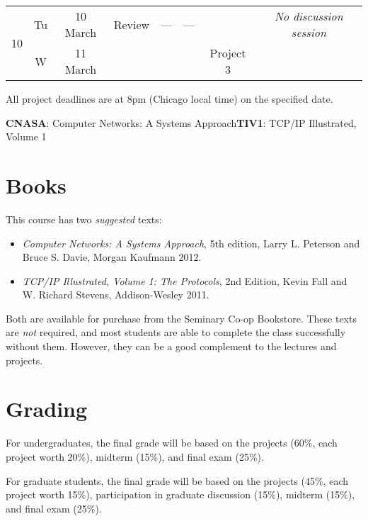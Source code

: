 \documentclass[11pt]{article}
\begin{document}
\begin{sidewaystable}
\begin{tabular}{|c|cc||p{6cm}|c|c|c|c|}
\multirow{2}{*}{10} & Tu & 10 March     & Review                                          & ---  & ---     & \cellcolor[gray]{0.9}  & \emph{No discussion session} \\\cline{2-7}
                    & W  & 11 March     & \cellcolor[gray]{0.9} & \cellcolor[gray]{0.9} & \cellcolor[gray]{0.9} &  Project 3 & \cellcolor[gray]{0.9} \\\hline
\end{tabular}
\begin{center}
All project deadlines are at 8pm (Chicago local time) on the specified date.

\textbf{CNASA}: Computer Networks: A Systems Approach\hspace{3ex}\textbf{TIV1}: TCP/IP Illustrated, Volume 1
\end{center}
\label{tab:calendar}
\end{sidewaystable}


\section{Books}

This course has two \emph{suggested} texts:

\begin{itemize}
 \item \emph{Computer Networks: A Systems Approach}, 5th edition, Larry L. Peterson and Bruce S. Davie, Morgan Kaufmann 2012.
 \item \emph{TCP/IP Illustrated, Volume 1: The Protocols}, 2nd Edition, Kevin Fall and W. Richard Stevens, Addison-Wesley 2011.
\end{itemize}

Both are available for purchase from the Seminary Co-op Bookstore. These texts are \emph{not} required, and most students are able to complete the class successfully without them. However, they can be a good complement to the lectures and projects.

  
\section{Grading}

For undergraduates, the final grade will be based on the projects (60\%, each project worth 20\%), midterm (15\%), and final exam (25\%).

For graduate students, the final grade will be based on the projects (45\%, each project worth 15\%), participation in graduate discussion (15\%), midterm (15\%), and final exam (25\%).
\end{document}
